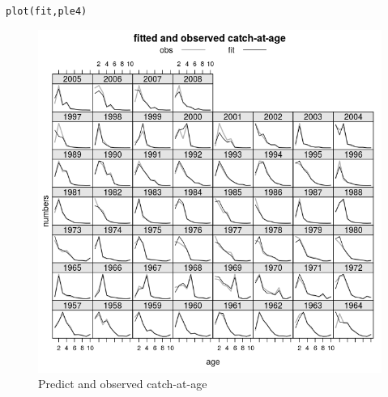 \documentclass[a4paper,english,10pt]{article}\usepackage[]{graphicx}\usepackage[]{color}
\makeatletter
\newcommand{\hlstd}[1]{\textcolor[rgb]{0.196,0.196,0.196}{#1}}%
\newcommand{\hlkwd}[1]{\textcolor[rgb]{0.78,0.227,0.412}{#1}}%
\newenvironment{kframe}{%
 \def\at@end@of@kframe{}%
 \ifinner\ifhmode%
  \def\at@end@of@kframe{\end{minipage}}%
  \begin{minipage}{\columnwidth}%
 \fi\fi%
 \def\FrameCommand##1{\hskip\@totalleftmargin \hskip-\fboxsep
 \colorbox{shadecolor}{##1}\hskip-\fboxsep
     \hskip-\linewidth \hskip-\@totalleftmargin \hskip\columnwidth}%
 \MakeFramed {\advance\hsize-\width
   \@totalleftmargin\z@ \linewidth\hsize
   \@setminipage}}%
 {\par\unskip\endMakeFramed%
 \at@end@of@kframe}
\newenvironment{knitrout}{}{} %
\makeatother
\begin{document}
\begin{knitrout}
\color{fgcolor}\begin{kframe}
\begin{alltt}
\hlkwd{plot}\hlstd{(fit, ple4)}
\end{alltt}
\end{kframe}\begin{figure}[H]

{\centering \includegraphics[width=.9\linewidth]{figure/selplt-1} 

}

\caption[Predict and observed catch-at-age]{Predict and observed catch-at-age}\label{fig:selplt}
\end{figure}


\end{knitrout}
\end{document}
